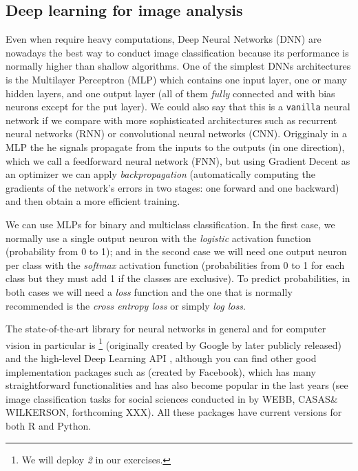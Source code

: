 \subsection{Deep learning for image analysis}
\label{subsec:deep}

Even when require heavy computations, Deep Neural Networks (DNN) are nowadays the best way to conduct image classification because its performance is normally higher than shallow algorithms. One of the simplest DNNs architectures is the Multilayer Perceptron (MLP) which contains one input layer, one or many hidden layers, and one output layer (all of them \textit{fully} connected and with bias neurons except for the put layer). We could also say that this is a \texttt{vanilla} neural network if we compare with more sophisticated architectures such as recurrent neural networks (RNN) or convolutional neural networks (CNN). Origginaly in a MLP the he signals propagate from the inputs to the outputs (in one direction), which we call a feedforward neural network (FNN), but using Gradient Decent as an optimizer we can apply \textit{backpropagation} (automatically computing the gradients of the network's errors in two stages: one forward and one backward) and then obtain a more efficient training.

We can use MLPs for binary and multiclass classification. In the first case, we normally use a single output neuron with the \textit{logistic} activation function (probability from 0 to 1); and in the second case we will need one output neuron per class with the \textit{softmax} activation function (probabilities from 0 to 1 for each class but they must add 1 if the classes are exclusive). To predict probabilities, in both cases we will need a \textit{loss} function and the one that is normally recommended is the \textit{cross entropy loss} or simply \textit{log loss}.

The state-of-the-art library for neural networks in general and for computer vision in particular is \footnote{We will deploy  \textit{2} in our exercises.}  (originally created by Google by later publicly released) and the high-level Deep Learning API , although you can find other good implementation packages such as  (created by Facebook), which has many straightforward functionalities and has also become popular in the last years (see image classification tasks for social sciences conducted in  by WEBB, CASAS\& WILKERSON, forthcoming XXX). All these packages have current versions for both R and Python. 

